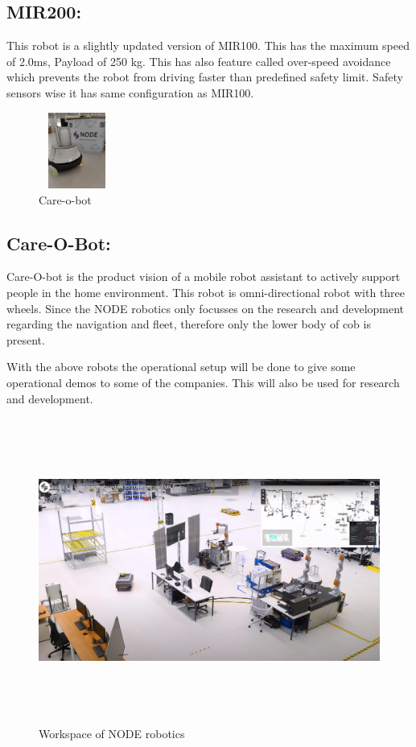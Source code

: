\subsection{MIR200:}	
This robot is a slightly updated version of MIR100. This has the maximum speed of 2.0ms, Payload of 250 kg. This has also feature called over-speed avoidance which prevents the robot from driving faster than predefined safety limit. Safety sensors wise it has same configuration as MIR100.


\begin{figure} %
	\centering
	\includegraphics[width=2.5cm,height=2.5cm]{images/cob.jpeg}
	\caption{Care-o-bot}
\end{figure}
\subsection{Care-O-Bot:}
Care-O-bot is the product vision of a mobile robot assistant to actively support people in the home environment. This robot is omni-directional robot with three wheels. Since the NODE robotics only focusses on the research and development regarding the navigation and fleet, therefore only the lower body of cob is present.
	

With the above robots the operational setup will be done to give some operational demos to some of the companies. This will also be used for research and development.

\begin{figure}[h]
	\begin{center}
		\includegraphics[height=10cm,width=\linewidth]{images/operation.jpg}
		\caption{Workspace of NODE robotics}
	\end{center}
\end{figure}

